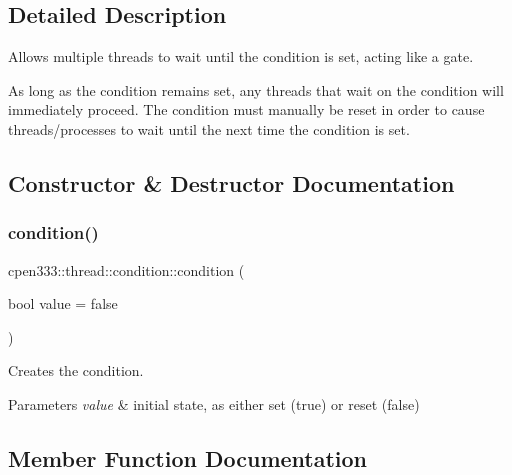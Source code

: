 \subsection{Detailed Description}
Allows multiple threads to wait until the condition is set, acting like a gate. 

As long as the condition remains set, any threads that wait on the condition will immediately proceed. The condition must manually be reset in order to cause threads/processes to wait until the next time the condition is set. 

\subsection{Constructor \& Destructor Documentation}
\mbox{\label{classcpen333_1_1thread_1_1condition_a3bd725835dd906ab14b7796cb425fe71}} 
\subsubsection{\texorpdfstring{condition()}{condition()}}
{\footnotesize\ttfamily cpen333\+::thread\+::condition\+::condition (\begin{DoxyParamCaption}\item[{bool}]{value = {\ttfamily false} }\end{DoxyParamCaption})\hspace{0.3cm}{\ttfamily [inline]}}



Creates the condition. 


\begin{DoxyParams}{Parameters}
{\em value} & initial state, as either set ({\ttfamily true}) or reset ({\ttfamily false}) \\
\hline
\end{DoxyParams}


\subsection{Member Function Documentation}
\mbox{\label{classcpen333_1_1thread_1_1condition_a12be978f0adb0bf17080797a38b6ead4}} 
